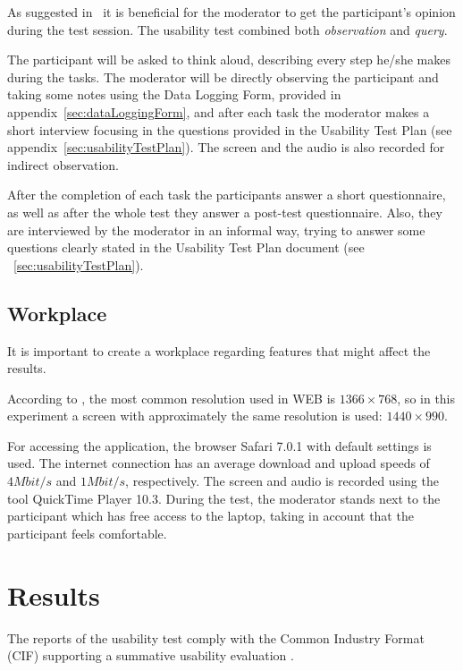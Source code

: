 \documentclass[a4paper]{article}
\begin{document}
As suggested in~\citep{mitchell2007step} it is beneficial for the moderator to get the participant's opinion during the test session.
The usability test combined both \emph{observation} and \textit{query}.

 The participant will be asked to think aloud, describing every step he/she makes during the tasks. The moderator will be directly observing the participant and taking some notes using the Data Logging Form, provided in appendix~\ref{sec:dataLoggingForm}, and after each task the moderator makes a short interview focusing in the questions provided in the Usability Test Plan (see appendix~\ref{sec:usabilityTestPlan}). The screen and the audio is also recorded for indirect observation.

 After the completion of each task the participants answer a short questionnaire, as well as after the whole test they answer a post-test questionnaire. Also, they are interviewed by the moderator in an informal way, trying to answer some questions clearly stated in the Usability Test Plan document (see ~\ref{sec:usabilityTestPlan}). 



\subsection{Workplace}
It is important to create a workplace regarding features that might affect the results.

According to \citep{http://www.satya-weblog.com/2013/07/desktop-laptop-mobile-screen-resolution-most-common-worldwide.html}, the most common resolution used in WEB is $1366\times 768$, so in this experiment a screen with approximately the same resolution is used: $1440\times 990$.

For accessing the application, the browser Safari 7.0.1 with default settings is used. The internet connection has an average download and upload speeds of $4 Mbit/s$ and $1Mbit/s$, respectively. The screen and audio is recorded using the tool QuickTime Player 10.3. During the test, the moderator stands next to the participant which has free access to the laptop, taking in account that the participant feels comfortable.



\section{Results}
The reports of the usability test comply with the Common Industry Format (CIF) supporting a summative usability evaluation \citep{iusr2006cif}.
\end{document}
